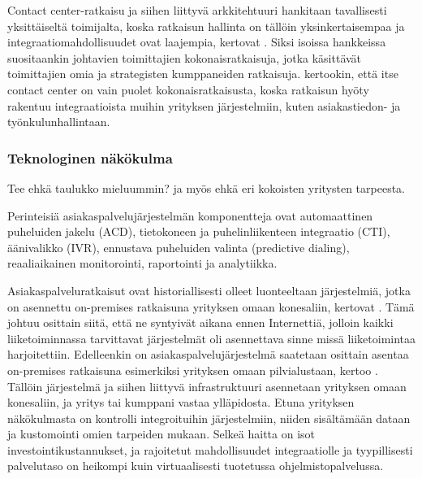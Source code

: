 \documentclass[finnish,12pt,a4paper,pdftex]{article}
\begin{document}
Contact center-ratkaisu ja siihen liittyvä arkkitehtuuri hankitaan tavallisesti yksittäiseltä toimijalta, koska ratkaisun hallinta on tällöin yksinkertaisempaa ja integraatiomahdollisuudet ovat laajempia, kertovat \cite{ccgartner}. Siksi isoissa hankkeissa suositaankin johtavien toimittajien kokonaisratkaisuja, jotka käsittävät toimittajien omia ja strategisten kumppaneiden ratkaisuja. \cite{bernier} kertookin, että itse contact center on vain puolet kokonaisratkaisusta, koska ratkaisun hyöty rakentuu integraatioista muihin yrityksen järjestelmiin, kuten asiakastiedon- ja työnkulunhallintaan.

\subsubsection{Teknologinen näkökulma} 

Tee ehkä taulukko mieluummin? ja myös ehkä eri kokoisten yritysten tarpeesta.

Perinteisiä asiakaspalvelujärjestelmän komponentteja ovat automaattinen puheluiden jakelu (ACD), tietokoneen ja puhelinliikenteen integraatio (CTI), äänivalikko (IVR), ennustava puheluiden valinta (predictive dialing), reaaliaikainen monitorointi, raportointi ja analytiikka.

Asiakaspalveluratkaisut ovat historiallisesti olleet luonteeltaan järjestelmiä, jotka on asennettu on-premises ratkaisuna yrityksen omaan konesaliin, kertovat \cite{vcc}. Tämä johtuu osittain siitä, että ne syntyivät aikana ennen Internettiä, jolloin kaikki liiketoiminnassa tarvittavat järjestelmät oli asennettava sinne missä liiketoimintaa harjoitettiin. Edelleenkin on asiakaspalvelujärjestelmä saatetaan osittain asentaa on-premises ratkaisuna esimerkiksi yrityksen omaan pilvialustaan, kertoo \cite{weiner}. Tällöin järjestelmä ja siihen liittyvä infrastruktuuri asennetaan yrityksen omaan konesaliin, ja yritys tai kumppani vastaa ylläpidosta. Etuna yrityksen näkökulmasta on kontrolli integroituihin järjestelmiin, niiden sisältämään dataan ja kustomointi omien tarpeiden mukaan. Selkeä haitta on isot investointikustannukset, ja rajoitetut mahdollisuudet integraatiolle ja tyypillisesti palvelutaso on heikompi kuin virtuaalisesti tuotetussa ohjelmistopalvelussa. 
\end{document}
